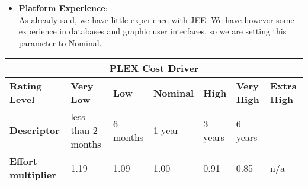 \begin{itemize}
\item \textbf{Platform Experience}:\\
As already said, we have little experience with JEE. We have however some experience in databases and graphic user interfaces, so we are setting this parameter to Nominal.
\end{itemize}
\hspace*{-3cm}\begin{tabular}{|p{3cm}|p{2cm}|p{2cm}|p{2cm}|p{2cm}|p{2cm}|p{2cm}|}
\hline
\multicolumn{7}{|c|}{\textbf{PLEX Cost Driver}}\\
\hline
\hline
\textbf{Rating Level} & \textbf{Very Low} & \textbf{Low} & \textbf{Nominal} & \textbf{High} & \textbf{Very High} & \textbf{Extra High}\\
\hline
\textbf{Descriptor} & less than 2 months & 6 months & 1 year & 3 years & 6 years & \\
\hline
\textbf{Effort multiplier} & 1.19 & 1.09 & 1.00 & 0.91 & 0.85 & n/a\\
\hline 
\end{tabular}

